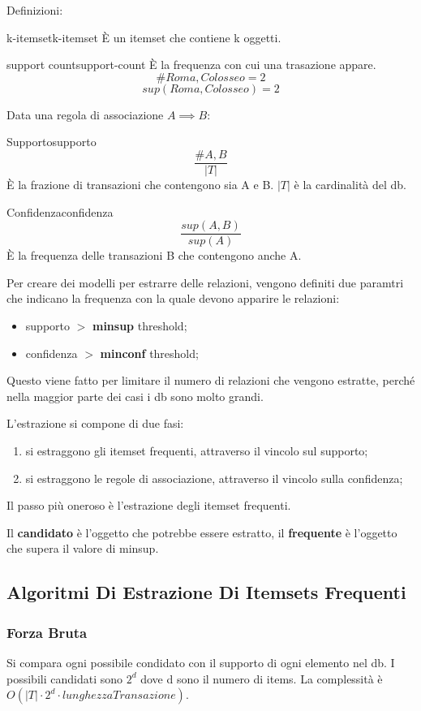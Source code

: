 \documentclass[12pt]{article}
\begin{document}
Definizioni:
\begin{definition}{k-itemset}{k-itemset}
    \`E un itemset che contiene k oggetti.
\end{definition}
\begin{definition}{support count}{support-count}
    \`E la frequenza con cui una trasazione appare.
    \[ \#{Roma, Colosseo} = 2 \]
    \[ sup(Roma, Colosseo) = 2 \]
\end{definition}
Data una regola di associazione $A \implies B$:
\begin{definition}{Supporto}{supporto}
    \[ \frac{\#{A,B}}{|T|} \]
    \`E la frazione di transazioni che contengono sia A e B. $|T|$ \`e la cardinalit\`a del db.
\end{definition}
\begin{definition}{Confidenza}{confidenza}
    \[ \frac{sup(A,B)}{sup(A)} \]
    \`E la frequenza delle transazioni B che contengono anche A.
\end{definition}
Per creare dei modelli per estrarre  delle relazioni, vengono definiti due paramtri che indicano la frequenza con la quale devono apparire le relazioni:
\begin{itemize}
    \item supporto $>$ \textbf{minsup} threshold;
    \item confidenza $>$ \textbf{minconf} threshold;
\end{itemize}
Questo viene fatto  per limitare il numero di relazioni che vengono estratte, perch\'e nella maggior parte dei casi i db sono molto grandi.

L'estrazione si compone di due fasi:
\begin{enumerate}
    \item si estraggono gli itemset frequenti, attraverso il vincolo sul supporto;
    \item si estraggono le regole di associazione, attraverso il vincolo sulla confidenza;
\end{enumerate}
Il passo pi\`u oneroso \`e l'estrazione degli itemset frequenti.

Il \textbf{candidato} \`e l'oggetto che potrebbe essere estratto, il \textbf{frequente} \`e l'oggetto che supera il valore di minsup.

\subsection{Algoritmi Di Estrazione Di Itemsets Frequenti}
\subsubsection{Forza Bruta}
Si compara ogni possibile condidato con il supporto di ogni elemento nel db. I possibili candidati sono $2^{d}$ dove d sono il numero di items. La complessit\`a \`e $O(|T| \cdot 2^{d} \cdot lunghezzaTransazione)$.
\end{document}
